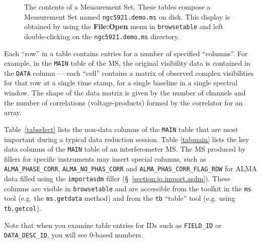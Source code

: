 \begin{figure}[h!]
\caption{\label{fig:tablekeyword} The contents of a Measurement
  Set. These tables compose a Measurement Set named {\tt ngc5921.demo.ms} on
  disk.  This display is obtained by using the {\bf File:Open} menu in
  {\tt browsetable} and left double-clicking on the {\tt ngc5921.demo.ms}
  directory.}
\hrulefill
\end{figure}

Each ``row'' in a table contains entries for a number of specified 
``columns''.  For example, in the {\tt MAIN} table of the MS, the
original visibility data is contained in the {\tt  DATA} column ---
each ``cell'' contains a matrix of observed
complex visibilities for that row at a single time stamp, for a single
baseline in a single spectral window.  The shape of the data matrix is
given by the number of channels and the number of correlations
(voltage-products) formed by the correlator for an array.  

Table~\ref{tabselect} lists the non-data columns of the {\tt MAIN}
table that are most important during a typical data reduction session.
Table \ref{tabmain} lists the key data columns of the {\tt MAIN} table
of an interferometer MS.  The MS produced by fillers for specific
instruments may insert special columns, such as
{\tt ALMA\_PHASE\_CORR}, {\tt ALMA\_NO\_PHAS\_CORR} and 
{\tt ALMA\_PHAS\_CORR\_FLAG\_ROW} for ALMA data filled using the 
{\tt importasdm} filler (\S~\ref{section:io.import.asdm}).
These columns are visible in {\tt browsetable} and are accessible from
the toolkit in the {\tt ms} tool (e.g. the {\tt ms.getdata} method)
and from the {\tt tb} ``table'' tool (e.g. using {\tt tb.getcol}).

Note that when you examine table entries for IDs such as {\tt FIELD\_ID} or 
{\tt DATA\_DESC\_ID}, you will see 0-based numbers.

